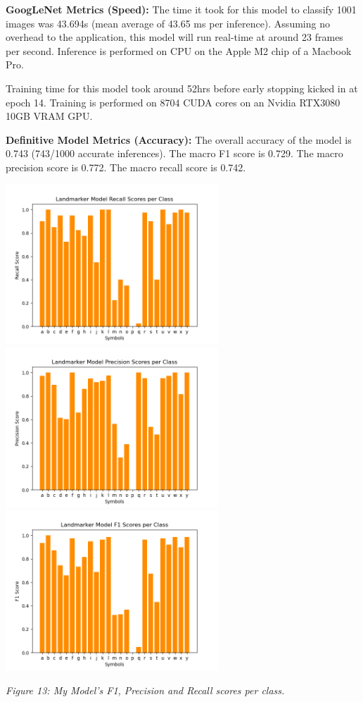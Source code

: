 \documentclass[11pt]{article}
\def\paraskip{\vskip 0.4cm}
\begin{document}
        \paraskip

        \noindent\textbf{GoogLeNet Metrics (Speed): }
        The time it took for this model to classify 1001 images was 43.694s (mean average of 43.65 ms per inference). Assuming no overhead to the application, this model will run real-time at around 23 frames per second. Inference is performed on CPU on the Apple M2 chip of a Macbook Pro.

        Training time for this model took around 52hrs before early stopping kicked in at epoch 14. Training is performed on 8704 CUDA cores on an Nvidia RTX3080 10GB VRAM GPU.

        \paraskip

        \noindent\textbf{Definitive Model Metrics (Accuracy): } 
        The overall accuracy of the model is 0.743 (743/1000 accurate inferences). The macro F1 score is 0.729. The macro precision score is 0.772. The macro recall score is 0.742.

        \begin{center}
            \includegraphics[width=8cm]{images/htrecall.png}
            \includegraphics[width=8cm]{images/htprec.png}
            \\
            \includegraphics[width=8cm]{images/htf1.png}
            \\
            \raggedright \textit{
            Figure 13: My Model's F1, Precision and Recall scores per class.
            }
        \end{center}
\end{document}
